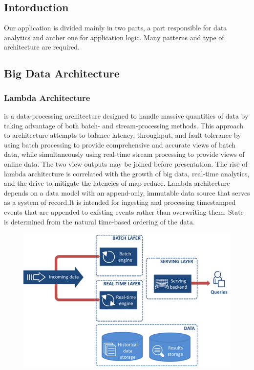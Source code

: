 \subsection{Intorduction}
\label{subsec:subsec01}
Our application is divided mainly in two parts,
 a part responsible for data analytics and anther one for application logic. Many patterns and type of architecture are required. 
\subsection{Big Data Architecture}
\label{subsec:subsec01}

\subsubsection{Lambda Architecture}
\label{subsec:subsec01}
is a data-processing architecture designed to handle massive quantities of data by taking advantage of both batch- and stream-processing methods. 
This approach to architecture attempts to balance latency, throughput, and fault-tolerance by using batch processing to provide comprehensive and accurate 
views of batch data, while simultaneously using real-time stream processing to provide views of online data. 
The two view outputs may be joined before presentation. The rise of lambda architecture is correlated with the growth of big data, real-time analytics, 
and the drive to mitigate the latencies of map-reduce. Lambda architecture depends on a data model with an append-only, immutable data source that
 serves as a system of record.It is intended for ingesting and processing timestamped events that are appended to existing events rather than 
 overwriting them. State is determined from the natural time-based ordering of the data.

\begin{figure}[h!]
	\centering
	\includegraphics[height=0.3\textheight]{fig01/lambda}
	\label{fig:FilialesEtClients}
\end{figure}
